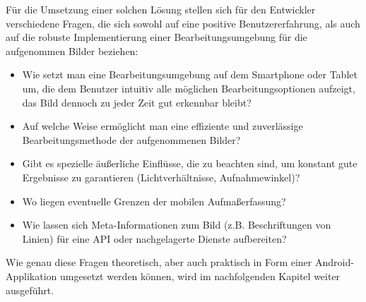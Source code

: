 \noindent
Für die Umsetzung einer solchen Lösung stellen sich für den Entwickler verschiedene Fragen, die sich sowohl auf eine positive Benutzererfahrung, als auch auf die robuste Implementierung einer Bearbeitungsumgebung für die aufgenommen Bilder beziehen:

\begin{itemize}
	\item Wie setzt man eine Bearbeitungsumgebung auf dem Smartphone oder Tablet um, die dem Benutzer intuitiv alle möglichen Bearbeitungsoptionen aufzeigt, das Bild dennoch zu jeder Zeit gut erkennbar bleibt?
	\item Auf welche Weise ermöglicht man eine effiziente und zuverlässige Bearbeitungsmethode der aufgenommenen Bilder?
	\item Gibt es spezielle äußerliche Einflüsse, die zu beachten sind, um konstant gute Ergebnisse zu garantieren (Lichtverhältnisse, Aufnahmewinkel)?
	\item Wo liegen eventuelle Grenzen der mobilen Aufmaßerfassung?
	\item Wie lassen sich Meta-Informationen zum Bild (z.B. Beschriftungen von Linien) für eine API oder nachgelagerte Dienste aufbereiten?
\end{itemize}

\noindent
Wie genau diese Fragen theoretisch, aber auch praktisch in Form einer Android-Applikation umgesetzt werden können, wird im nachfolgenden Kapitel weiter ausgeführt. 
